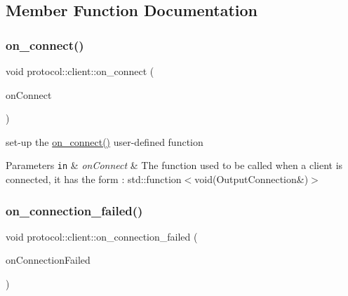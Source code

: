 \subsection{Member Function Documentation}
\mbox{\label{classprotocol_1_1client_a0178fdb73323150789236de9d97e4d07}} 
\subsubsection{\texorpdfstring{on\+\_\+connect()}{on\_connect()}}
{\footnotesize\ttfamily void protocol\+::client\+::on\+\_\+connect (\begin{DoxyParamCaption}\item[{const std\+::function$<$ void(\hyperlink{classprotocol_1_1_output_connection}{Output\+Connection} \&)$>$ \&}]{on\+Connect }\end{DoxyParamCaption})}



set-\/up the \hyperlink{classprotocol_1_1client_a0178fdb73323150789236de9d97e4d07}{on\+\_\+connect()} user-\/defined function 


\begin{DoxyParams}[1]{Parameters}
\mbox{\tt in}  & {\em on\+Connect} & The function used to be called when a client is connected, it has the form \+: std\+::function$<$void(\+Output\+Connection\&)$>$ \\
\hline
\end{DoxyParams}
\mbox{\label{classprotocol_1_1client_ad1482f806b94bada8cdda1057b06c0d1}} 
\subsubsection{\texorpdfstring{on\+\_\+connection\+\_\+failed()}{on\_connection\_failed()}}
{\footnotesize\ttfamily void protocol\+::client\+::on\+\_\+connection\+\_\+failed (\begin{DoxyParamCaption}\item[{const std\+::function$<$ void()$>$ \&}]{on\+Connection\+Failed }\end{DoxyParamCaption})}



